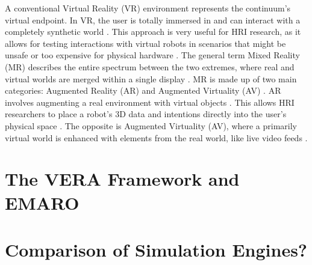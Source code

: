 A conventional Virtual Reality (VR) environment represents the continuum's virtual endpoint. In VR, the user is totally immersed in and can interact with a completely synthetic world \cite{MK94}. This approach is very useful for HRI research, as it allows for testing interactions with virtual robots in scenarios that might be unsafe or too expensive for physical hardware \cite{Walker2023}. The general term Mixed Reality (MR) describes the entire spectrum between the two extremes, where real and virtual worlds are merged within a single display \cite{MK94}. MR is made up of two main categories: Augmented Reality (AR) and Augmented Virtuality (AV) \cite{MK94, MV20}. AR involves augmenting a real environment with virtual objects \cite{MK94}. This allows HRI researchers to place a robot's 3D data and intentions directly into the user's physical space \cite{Walker2023}. The opposite is Augmented Virtuality (AV), where a primarily virtual world is enhanced with elements from the real world, like live video feeds \cite{MK94}.

\section{The VERA Framework and EMARO}

\section{Comparison of Simulation Engines?}